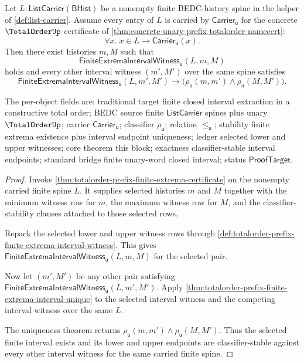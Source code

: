 \begin{theorem}
\label{thm:totalorder-prefix-finite-extrema-interval-certificate}
Let $L:\mathsf{ListCarrier}(\mathsf{BHist})$ be a nonempty finite BEDC-history
spine in the helper of \autoref{def:list-carrier}. Assume every entry of $L$ is
carried by $\mathsf{Carrier}_{\mathsf{u}}$ for the concrete $\TotalOrderUp$
certificate of \autoref{thm:concrete-unary-prefix-totalorder-namecert}:
$$
\forall x.\; x\in L\to \mathsf{Carrier}_{\mathsf{u}}(x).
$$
Then there exist histories $m,M$ such that
$$
\mathsf{FiniteExtremaIntervalWitness}_{\mathsf{u}}(L,m,M)
$$
holds and every other interval witness $(m',M')$ over the same spine satisfies
$$
\mathsf{FiniteExtremaIntervalWitness}_{\mathsf{u}}(L,m',M')
\to
\bigl(\rho_{\mathsf{u}}(m,m')\land\rho_{\mathsf{u}}(M,M')\bigr).
$$

The per-object fields are: traditional target finite closed interval extraction
in a constructive total order; BEDC source finite $\mathsf{ListCarrier}$ spines
plus unary $\TotalOrderUp$; carrier $\mathsf{Carrier}_{\mathsf{u}}$; classifier
$\rho_{\mathsf{u}}$; relation $\le_{\mathsf{u}}$; stability finite extrema
existence plus interval endpoint uniqueness; ledger selected lower and upper
witnesses; core theorem this block; exactness classifier-stable interval
endpoints; standard bridge finite unary-word closed interval; status
$\mathsf{ProofTarget}$.
\end{theorem}
\begin{proof}
Invoke \autoref{thm:totalorder-prefix-finite-extrema-certificate} on the
nonempty carried finite spine $L$. It supplies selected histories $m$ and $M$
together with the minimum witness row for $m$, the maximum witness row for $M$,
and the classifier-stability clauses attached to those selected rows.

Repack the selected lower and upper witness rows through
\autoref{def:totalorder-prefix-finite-extrema-interval-witness}. This gives
$\mathsf{FiniteExtremaIntervalWitness}_{\mathsf{u}}(L,m,M)$ for the selected
pair.

Now let $(m',M')$ be any other pair satisfying
$\mathsf{FiniteExtremaIntervalWitness}_{\mathsf{u}}(L,m',M')$. Apply
\autoref{thm:totalorder-prefix-finite-extrema-interval-unique} to the selected
interval witness and the competing interval witness over the same $L$.

The uniqueness theorem returns
$\rho_{\mathsf{u}}(m,m')\land\rho_{\mathsf{u}}(M,M')$. Thus the selected
finite interval exists and its lower and upper endpoints are classifier-stable
against every other interval witness for the same carried finite spine.
\end{proof}
